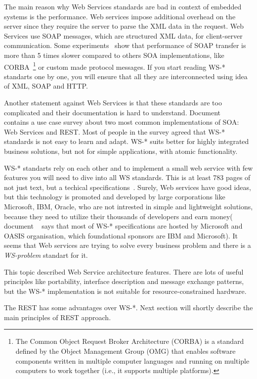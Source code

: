 The main reason why Web Services standards are bad in context of embedded
systems is the performance.
Web services impose additional overhead on the server since they require the
server to parse the \gls{XML} data in the request. Web Services use \gls{SOAP}
messages, which are structured \gls{XML} data, for client-server communication.
Some experiments~\cite{1182978, 5470528} show that performance of SOAP transfer
is more than 5 times slower compared to others \gls{SOA} implementations, like
CORBA~\footnote{The Common Object Request Broker Architecture (CORBA) is a
standard defined by the Object Management Group (OMG) that enables software
components written in multiple computer languages and running on multiple
computers to work together (i.e., it supports multiple
platforms).\cite{wikipedia:CORBA}} or custom made protocol messages. If you
start reading WS-* standarts one by one, you will ensure that all they are
interconnected using idea of \gls{XML}, \gls{SOAP} and \gls{HTTP}. 


Another statement against Web Services is that these standards are too
complicated and their documentation is hard to
understand. Document ~\cite{dguinard-rest-vs-ws} contains a use case survey
about two most common implementations of SOA: Web Services and \gls{REST}. Most of people
in the survey agreed that WS-* standards is not easy to learn and adapt. WS-*
suits better for highly integrated business solutions, but not for simple
applications, with atomic functionality.

WS-* standarts rely on each other and to implement a small web service with
few features you will need to dive into all WS standards. This is at least 783
pages of not just text, but a techical specifications~\cite{ws_pagecount}.
Surely, Web services have good ideas, but this technology is promoted and
developed by large corporations like Microsoft, IBM, Oracle, who are not
intrested in simple and lightweight solutions, because they need to utilize
their thousands of developers and earn money( document ~\cite{ws_pagecount} says
that most of WS-* specifications are hosted by Microsoft and  OASIS
organisation, which foundational sponsors are IBM and Microsoft).
It seems that Web services are trying to solve every business problem and there
is a \textit{WS-problem} standart for it.


This topic described Web Service architecture features. There are lots of
useful principles like portability, interface description and message exchange
patterns, but the WS-* implementation is not suitable for resource-constrained
hardware.


The \gls{REST} has some advantages over WS-*. Next section will shortly
describe the main principles of \gls{REST} approach. 





